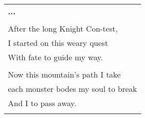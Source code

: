 \documentclass{article}
\begin{document}
\begin{center}
\begin{tabular}{l}
\textbf{...} \\
\\
After the long Knight Con-test, \\
I started on this weary quest \\
With fate to guide my way. \\
\\ %
Now this mountain's path I take \\ %
each monster bodes my soul to break \\ %
And I to pass away. \\ %
\\
\end{tabular}
\end{center}
\end{document}
